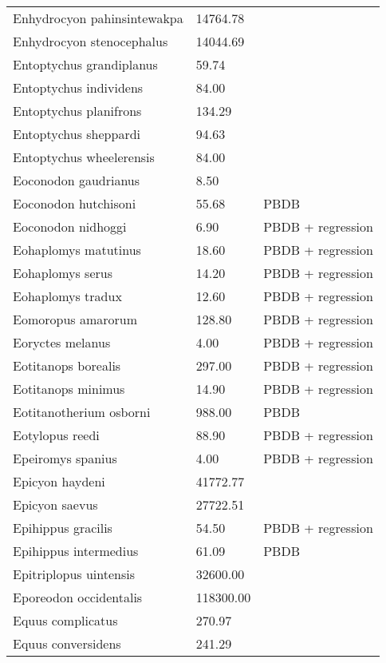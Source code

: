 \documentclass{article}
\begin{document}
\begin{center}
\begin{longtable}{p{} p{} p{}}
    Enhydrocyon pahinsintewakpa & 14764.78 & \cite{Tomiya2013} \\ 
    Enhydrocyon stenocephalus & 14044.69 & \cite{Tomiya2013} \\ 
    Entoptychus grandiplanus & 59.74 & \cite{Tomiya2013} \\ 
    Entoptychus individens & 84.00 & \cite{McKenna2011} \\ 
    Entoptychus planifrons & 134.29 & \cite{Tomiya2013} \\ 
    Entoptychus sheppardi & 94.63 & \cite{Tomiya2013} \\ 
    Entoptychus wheelerensis & 84.00 & \cite{McKenna2011} \\ 
    Eoconodon gaudrianus & 8.50 & \cite{Zonneveld2003} \\ 
    Eoconodon hutchisoni & 55.68 & PBDB \\ 
    Eoconodon nidhoggi & 6.90 & PBDB + regression \\ 
    Eohaplomys matutinus & 18.60 & PBDB + regression \\ 
    Eohaplomys serus & 14.20 & PBDB + regression \\ 
    Eohaplomys tradux & 12.60 & PBDB + regression \\ 
    Eomoropus amarorum & 128.80 & PBDB + regression \\ 
    Eoryctes melanus & 4.00 & PBDB + regression \\ 
    Eotitanops borealis & 297.00 & PBDB + regression \\ 
    Eotitanops minimus & 14.90 & PBDB + regression \\ 
    Eotitanotherium osborni & 988.00 & PBDB \\ 
    Eotylopus reedi & 88.90 & PBDB + regression \\ 
    Epeiromys spanius & 4.00 & PBDB + regression \\ 
    Epicyon haydeni & 41772.77 & \cite{Tomiya2013} \\ 
    Epicyon saevus & 27722.51 & \cite{Tomiya2013} \\ 
    Epihippus gracilis & 54.50 & PBDB + regression \\ 
    Epihippus intermedius & 61.09 & PBDB \\ 
    Epitriplopus uintensis & 32600.00 & \cite{MacFadden1986} \\ 
    Eporeodon occidentalis & 118300.00 & \cite{McKenna2011} \\ 
    Equus complicatus & 270.97 & \cite{Smith2004} \\ 
    Equus conversidens & 241.29 & \cite{Smith2004} \\ 

\end{longtable}
\end{center}
\end{document}
